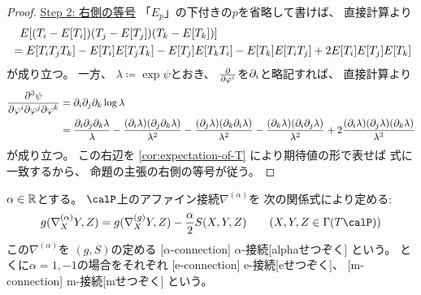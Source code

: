 \documentclass[report]{jlreq}
\begin{document}
\begin{proof}
    \uline{Step 2: 右側の等号} \quad
    「$E_p$」の下付きの$p$を省略して書けば、
    直接計算より
    \begin{alignat}{1}
        &\phantom{=}
            E[(T_i - E[T_i])(T_j - E[T_j])(T_k - E[T_k])]
            \\
        &=
            E[T_i T_j T_k]
            - E[T_i] E[T_j T_k]
            - E[T_j] E[T_k T_i]
            - E[T_k] E[T_i T_j]
            + 2 E[T_i] E[T_j] E[T_k]
            \locallabel{eq:1}
    \end{alignat}
    が成り立つ。
    一方、
    $\lambda \coloneqq \exp \psi$とおき、
    $\deldel{\varphi^i}$を$\partial_i$と略記すれば、
    直接計算より
    \begin{alignat}{1}
        \frac{\partial^3 \psi}{\partial \varphi^i \partial \varphi^j \partial \varphi^k}
            &=
                \partial_i
                \partial_j
                \partial_k
                \log \lambda
                \\
            &=
                \frac{\partial_i \partial_j \partial_k \lambda}{\lambda}
                - \frac{(\partial_i \lambda) (\partial_j \partial_k \lambda)}{\lambda^2}
                - \frac{(\partial_j \lambda) (\partial_k \partial_i \lambda)}{\lambda^2}
                - \frac{(\partial_k \lambda) (\partial_i \partial_j \lambda)}{\lambda^2}
                + 2 \frac{(\partial_i \lambda) (\partial_j \lambda) (\partial_k \lambda)}{\lambda^3}
    \end{alignat}
    が成り立つ。
    この右辺を
    \cref{cor:expectation-of-T}
    により期待値の形で表せば
    式に一致するから、
    命題の主張の右側の等号が従う。
\end{proof}

\begin{definition}[$\alpha$-接続]
    $\alpha \in \mathbb{R}$とする。
    $\calP$上のアファイン接続$\nabla^{(\alpha)}$を
    次の関係式により定める:
    \begin{equation}
        g(\nabla^{(\alpha)}_X Y, Z)
            =
                g(\nabla^{(g)}_X Y, Z)
                -
                \frac{\alpha}{2} S(X, Y, Z)
                \qquad
                (X, Y, Z \in \Gamma(T\calP))
    \end{equation}
    この$\nabla^{(\alpha)}$を
    $(g, S)$の定める
    [$\alpha$-connection]
        {$\alpha$-接続}[alphaせつぞく]
    という。
    とくに$\alpha = 1, -1$の場合をそれぞれ
    [e-connection]
        {e-接続}[eせつぞく]、
    [m-connection]
        {m-接続}[mせつぞく]
    という。
\end{definition}
\end{document}
